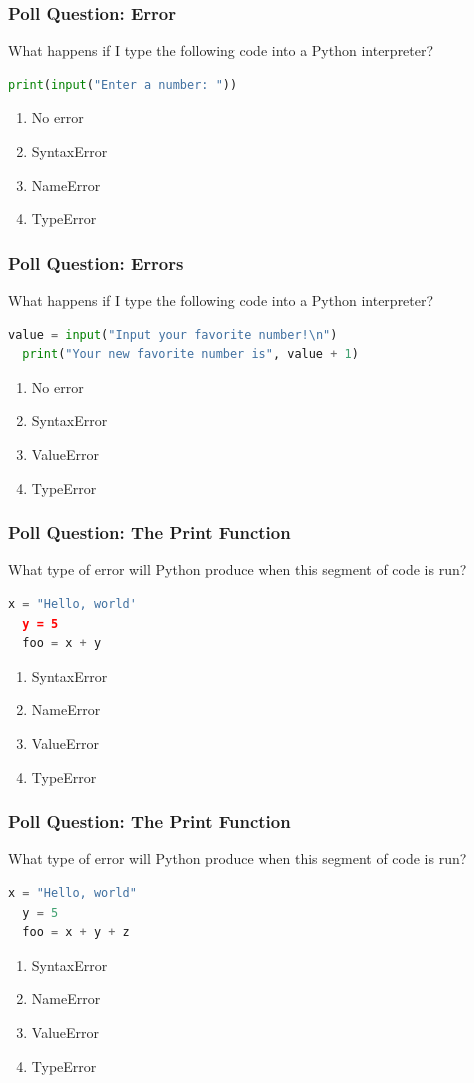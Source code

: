 \documentclass{beamer}
\begin{document}
%
%
%
\begin{frame}[fragile]
  \frametitle{Poll Question: Error}
  What happens if I type the following code into a Python interpreter?
  \begin{lstlisting}[language=Python]
  print(input("Enter a number: "))\end{lstlisting}
  \begin{enumerate}[A]
    \item No error
    \item SyntaxError
    \item NameError
    \item TypeError
  \end{enumerate}
\end{frame}

%
%
%
\begin{frame}[fragile]
  \frametitle{Poll Question: Errors}
  What happens if I type the following code into a Python interpreter?
  \begin{lstlisting}[language=Python]
  value = input("Input your favorite number!\n")
  print("Your new favorite number is", value + 1)\end{lstlisting}
  \begin{enumerate}[A]
    \item No error
    \item SyntaxError
    \item ValueError
    \item TypeError
  \end{enumerate}
\end{frame}

%
%
%
\begin{frame}[fragile]
  \frametitle{Poll Question: The Print Function}
  What type of error will Python produce when this segment of code is run?
  \begin{lstlisting}[language=Python]
  x = "Hello, world'
  y = 5
  foo = x + y\end{lstlisting}
  \begin{enumerate}[A]
    \item SyntaxError
    \item NameError
    \item ValueError
    \item TypeError
  \end{enumerate}
\end{frame}


%
%
%
\begin{frame}[fragile]
  \frametitle{Poll Question: The Print Function}
  What type of error will Python produce when this segment of code is run?
  \begin{lstlisting}[language=Python]
  x = "Hello, world"
  y = 5
  foo = x + y + z\end{lstlisting}
  \begin{enumerate}[A]
    \item SyntaxError
    \item NameError
    \item ValueError
    \item TypeError
  \end{enumerate}
\end{frame}
\end{document}
